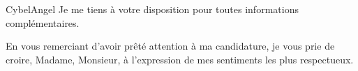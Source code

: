 \documentclass[11pt]{lettre}
\begin{document}
\begin{letter}{CybelAngel}
    Je me tiens à votre disposition pour toutes informations complémentaires.

 
 
 
 
 






    
    \closing{En vous remerciant d’avoir prêté attention à ma candidature, je vous prie de croire, Madame, Monsieur, à l’expression de mes sentiments les plus respectueux.}
    
 
\end{letter}
 
\end{document}

